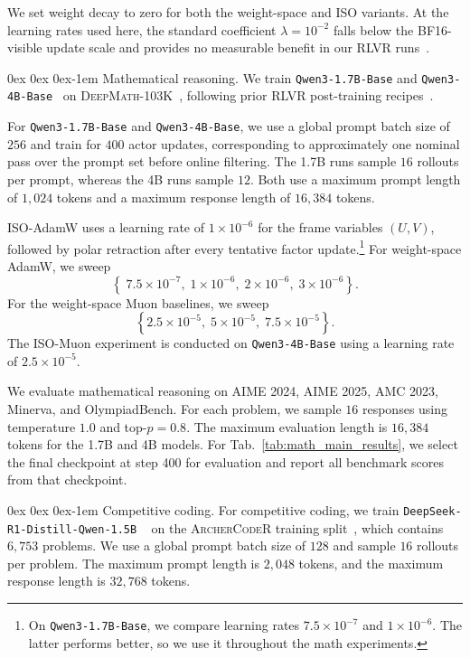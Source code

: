 \documentclass[11pt, a4paper]{utda}
\makeatletter
\renewcommand{\paragraph}{%
  \@startsection{paragraph}{4}%
  {\z@}{0ex \@plus 0ex \@minus 0ex}{-1em}%
  {\normalfont\normalsize\bfseries}%
}
\theoremstyle{plain}
\theoremstyle{definition}
\theoremstyle{remark}
\makeatother
\begin{document}
We set weight decay to zero for both the weight-space and ISO variants. At the
learning rates used here, the standard coefficient $\lambda=10^{-2}$ falls
below the BF16-visible update scale and provides no measurable benefit in our
RLVR runs~\cite{zhu2025path}.

\paragraph{Mathematical reasoning.}
We train
\texttt{Qwen3-1.7B-Base} and \texttt{Qwen3-4B-Base}~\cite{qwen3technicalreport}
on \textsc{DeepMath}-103K~\cite{deepmath}, following prior RLVR
post-training recipes~\cite{schulman2025lora}.

For \texttt{Qwen3-1.7B-Base} and \texttt{Qwen3-4B-Base}, we use a global
prompt batch size of $256$ and train for $400$ actor updates, corresponding to
approximately one nominal pass over the prompt set before online filtering.
The 1.7B runs sample $16$ rollouts per prompt, whereas the 4B runs sample $12$.
Both use a maximum prompt length of $1{,}024$ tokens and a maximum response
length of $16{,}384$ tokens.

ISO-AdamW uses a learning rate of
$1\times10^{-6}$ for the frame variables $(U,V)$, followed by polar
retraction after every tentative factor update.\footnote{On
\texttt{Qwen3-1.7B-Base}, we compare learning rates
$7.5\times10^{-7}$ and $1\times10^{-6}$. The latter performs better, so we
use it throughout the math experiments.}
For weight-space AdamW, we sweep
\[
    \left\{
        \;7.5\times10^{-7},
        \;1\times10^{-6},
        \;2\times10^{-6},
        \;3\times10^{-6}
    \right\}.
\]
For the weight-space Muon baselines, we sweep
\[
    \left\{
        2.5\times10^{-5},
        \;5\times10^{-5},
        \;7.5\times10^{-5}
    \right\}.
\]
The ISO-Muon experiment is conducted on
\texttt{Qwen3-4B-Base} using a learning rate of
$2.5\times10^{-5}$.

We evaluate mathematical reasoning on AIME 2024, AIME 2025, AMC 2023,
Minerva, and OlympiadBench. For each problem, we sample $16$ responses using
temperature $1.0$ and top-$p=0.8$. The maximum evaluation length is
$16{,}384$ tokens for the 1.7B and 4B models.
For Tab.~\ref{tab:math_main_results}, we
select the final checkpoint at step 400 for evaluation and report all benchmark scores from that checkpoint.

\paragraph{Competitive coding.}\label{app:coding_details}
For competitive coding, we train
\texttt{DeepSeek-R1-Distill-Qwen-1.5B}
~\cite{deepseek_r1}
on the \textsc{ArcherCodeR} training split~\cite{wang2025stabilizing}, which
contains $6{,}753$ problems. We use a global prompt batch size of $128$ and
sample $16$ rollouts per problem. The maximum prompt length is $2{,}048$
tokens, and the maximum response length is $32{,}768$ tokens.
\end{document}
